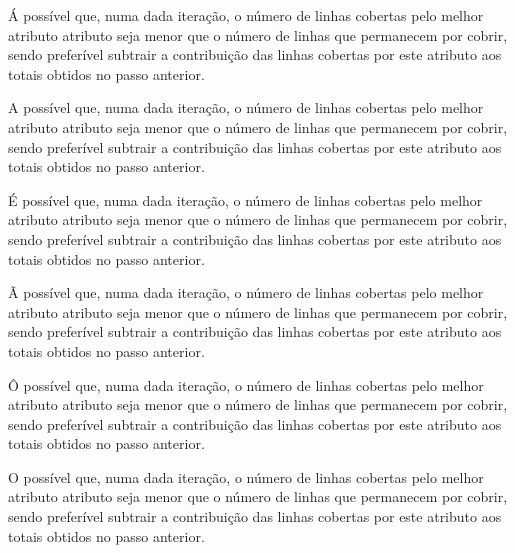 \documentclass[portuguese,a4paper]{report}
\begin{document}
Á possível que, numa dada iteração, o número de linhas cobertas pelo melhor atributo atributo seja menor que o número de linhas que permanecem por cobrir, sendo preferível subtrair a contribuição das linhas cobertas por este atributo aos totais obtidos no passo anterior.

A possível que, numa dada iteração, o número de linhas cobertas pelo melhor
atributo atributo seja menor que o número de linhas que permanecem por cobrir,
sendo preferível subtrair a contribuição das linhas cobertas por este atributo
aos totais obtidos no passo anterior.

É possível que, numa dada iteração, o número de linhas cobertas pelo melhor atributo atributo seja menor que o número de linhas que permanecem por cobrir, sendo preferível subtrair a contribuição das linhas cobertas por este atributo aos totais obtidos no passo anterior.

Ã possível que, numa dada iteração, o número de linhas cobertas pelo melhor atributo atributo seja menor que o número de linhas que permanecem por cobrir, sendo preferível subtrair a contribuição das linhas cobertas por este atributo aos totais obtidos no passo anterior.

Ô possível que, numa dada iteração, o número de linhas cobertas pelo melhor atributo atributo seja menor que o número de linhas que permanecem por cobrir, sendo preferível subtrair a contribuição das linhas cobertas por este atributo aos totais obtidos no passo anterior.

O possível que, numa dada iteração, o número de linhas cobertas pelo melhor
atributo atributo seja menor que o número de linhas que permanecem por cobrir,
sendo preferível subtrair a contribuição das linhas cobertas por este atributo
aos totais obtidos no passo anterior.
\end{document}
